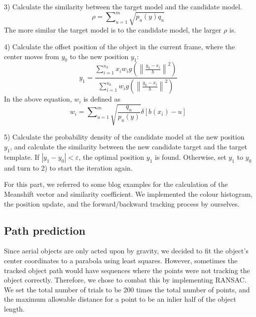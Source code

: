 \documentclass[12pt]{article}
\begin{document}
3) Calculate the similarity between the target model and the candidate model.
\[\rho  = \sum\nolimits_{u = 1}^m {\sqrt {{p_u}(y){q_u}} } \]
The more similar the target model is to the candidate model, the larger $\rho $ is.

4) Calculate the offset position of the object in the current frame, where the center moves from  ${y_0}$ to the new position ${y_1}$:
\[{y_1} = \frac{{\sum\limits_{i = 1}^{{n_k}} {{x_i}{w_i}g({{\left\| {\frac{{{y_0} - {x_i}}}{h}} \right\|}^2})} }}{{\sum\limits_{i = 1}^{{n_k}} {{w_i}g({{\left\| {\frac{{{y_0} - {x_i}}}{h}} \right\|}^2})} }}\]
In the above equation, ${w_i}$ is defined as \[{w_i} = \sum\nolimits_{u = 1}^m {\sqrt {\frac{{{q_u}}}{{{p_u}(y)}}} } \delta [b({x_i}) - u]\]

5) Calculate the probability density of the candidate model at the new position ${y_1}$, and calculate the similarity between the new candidate target and the target template. If $\left| {{y_1} - {y_0}} \right| < \varepsilon $, the optimal position ${y_1}$ is found. Otherwise, set ${y_1}$ to ${y_0}$ and turn to 2) to start the iteration again.

For this part, we referred to some blog examples for the calculation of the Meanshift vector and similarity coefficient\cite{meanshiftblog1}\cite{meanshiftblog2}. We implemented the colour histogram, the position update, and the forward/backward tracking process by ourselves.


\subsection*{Path prediction}

Since aerial objects are only acted upon by gravity, we decided to fit the object's center coordinates to a parabola using least squares. However, sometimes the tracked object path would have sequences where the points were not tracking the object correctly. Therefore, we chose to combat this by implementing RANSAC. We set the total number of trials to be 200 times the total number of points, and the maximum allowable distance for a point to be an inlier half of the object length.
\end{document}
